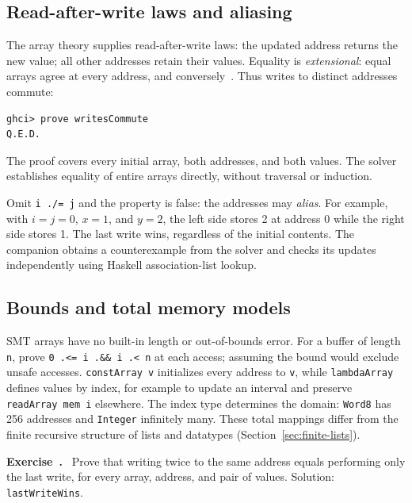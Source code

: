 \documentclass[review]{jfp-epi}
\newcommand{\code}[1]{\texttt{#1}}
\newcounter{exercise}
\newenvironment{exercise}{\refstepcounter{exercise}\par\medskip\noindent
  \textbf{Exercise~\theexercise.}\ }{\par\medskip}
\begin{document}
\subsection{Read-after-write laws and aliasing}

The array theory supplies read-after-write laws: the updated address returns
the new value; all other addresses retain their values. Equality is
\emph{extensional}: equal arrays agree at every address, and
conversely~\citep{smtarrays}. Thus writes to distinct addresses commute:
\begin{lstlisting}[style=output]
ghci> prove writesCommute
Q.E.D.
\end{lstlisting}
The proof covers every initial array, both addresses, and both values. The solver
establishes equality of entire arrays directly, without traversal or induction.

Omit \code{i ./= j} and the property is false: the addresses may \emph{alias}.
For example, with $i=j=0$, $x=1$, and $y=2$, the left side stores 2 at address
0 while the right side stores 1. The last write wins, regardless of the initial
contents. The companion obtains a counterexample from the solver and checks
its updates independently using Haskell association-list lookup.

\subsection{Bounds and total memory models}

SMT arrays have no built-in length or out-of-bounds error. For a buffer of length
\code{n}, prove \code{0 .<= i .\&\& i .< n} at each access; assuming the bound
would exclude unsafe accesses. \code{constArray v} initializes every address to
\code{v}, while \code{lambdaArray} defines values by index, for example to update
an interval and preserve \code{readArray mem i} elsewhere.
The index type determines the domain: \code{Word8} has 256 addresses and
\code{Integer} infinitely many. These total mappings differ from the finite
recursive structure of lists and datatypes (Section~\ref{sec:finite-lists}).

\begin{exercise}
Prove that writing twice to the same address equals performing only the last
write, for every array, address, and pair of values. Solution: \code{lastWriteWins}.
\end{exercise}

\end{document}
